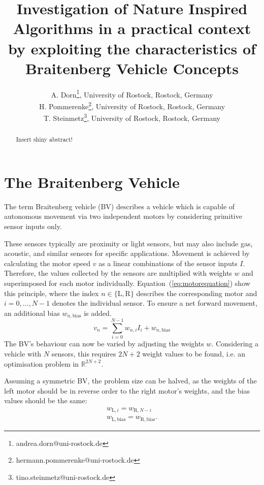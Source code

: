 \documentclass[a4paper]{article}
\begin{document}
\title{Investigation of Nature Inspired Algorithms in a practical context by exploiting the characteristics of Braitenberg Vehicle Concepts}

\author{A. Dorn\thanks{andrea.dorn@uni-rostock.de}, University of Rostock, Rostock, Germany \\
		H. Pommerenke\thanks{hermann.pommerenke@uni-rostock.de}, University of Rostock, Rostock, Germany \\
		T. Steinmetz\thanks{tino.steinmetz@uni-rostock.de}, University of Rostock, Rostock, Germany}
	
\maketitle


\begin{abstract}
   Insert shiny abstract!
\end{abstract}

\section{The Braitenberg Vehicle}

The term Braitenberg vehicle (BV) describes a vehicle which is capable of autonomous movement via two independent motors by considering primitive sensor inputs only.

These sensors typically are proximity or light sensors, but may also include gas, acoustic, and similar sensors for specific applications. Movement is achieved by calculating the motor speed $v$ as a linear combinations of the sensor inputs $I$. Therefore, the values collected by the sensors are multiplied with weights $w$ and superimposed for each motor individually. Equation~(\ref{eq:motorequation}) show this principle, where the index $n\in\{\mathrm{L},\mathrm{R}\}$ describes the corresponding motor and $i=0,\ldots,N-1$ denotes the individual sensor. To ensure a net forward movement, an additional bias $w_{n,\text{bias}}$ is added.
\begin{equation}
	v_{n} = \sum\limits_{i=0}^{N-1} w_{n,i} I_{i} + w_{n,\text{bias}}
	\label{eq:motorequation}
\end{equation}
The BV's behaviour can now be varied by adjusting the weights $w$. Considering a vehicle with $N$ sensors, this requires $2N+2$ weight values to be found, i.e. an optimisation problem in $\mathbb{R}^{2N+2}$.

Assuming a symmetric BV, the problem size can be halved, as the weights of the left motor should be in reverse order to the right motor's weights, and the bias values should be the same:
\begin{align}
	w_{\mathrm{L}, i} = w_{\mathrm{R}, N-i} \nonumber \\
	w_{\mathrm{L},\text{bias}} = w_{\mathrm{R},\text{bias}}.\label{eq:symmetry}
\end{align}
\end{document}
